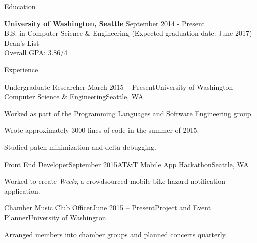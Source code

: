 \documentclass{resume} %
\begin{document}

\begin{rSection}{Education}

  {\bf University of Washington, Seattle} \hfill {September 2014 - Present} \\
  B.S. in Computer Science \& Engineering (Expected graduation date: June 2017) \\
  Dean's List \\
  Overall GPA: 3.86/4

\end{rSection}


\begin{rSection}{Experience}

  \begin{rSubsection}{Undergraduate Researcher}
    {March 2015 -- Present}{University of Washington Computer Science \& Engineering}{Seattle, WA}
  \item Worked as part of the Programming Languages and Software Engineering
    group.
  \item Wrote approximately 3000 lines of code in the summer of 2015.
  \item Studied patch minimization and delta debugging.
  \end{rSubsection}

  \begin{rSubsection}{Front End Developer}{September 2015}{AT\&T Mobile App Hackathon}{Seattle, WA}
  \item Worked to create \emph{Weelz}, a crowdsourced mobile bike hazard notification application.
  \end{rSubsection}

  \begin{rSubsection}{Chamber Music Club Officer}{June 2015 -- Present}{Project and Event Planner}{University of Washington}
  \item Arranged members into chamber groups and planned concerts quarterly.
  \end{rSubsection}

\end{rSection}
\end{document}
